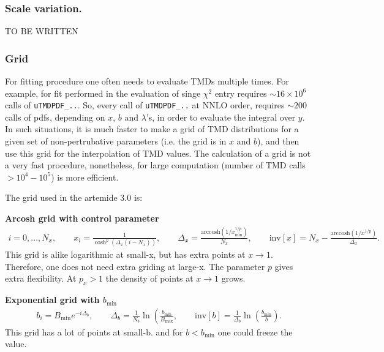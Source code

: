 \documentclass[prd,nofootinbib,eqsecnum,final]{revtex4}
\renewcommand{\(}{\left(}
\renewcommand{\)}{\right)}
\renewcommand{\[}{\left[}
\renewcommand{\]}{\right]}
\begin{document}
\subsubsection{Scale variation.} 

TO BE WRITTEN

\subsubsection{Grid}
\label{sec:OPE:grid1}

For fitting procedure one often needs to evaluate TMDs multiple times. For example, for fit performed in \cite{Scimemi:2017etj} the evaluation of singe $\chi^2$ entry requires $\sim 16\times 10^6$ calls of \texttt{uTMDPDF{\_}..}. So, every call of \texttt{uTMDPDF{\_}..} at NNLO order, requires $\sim 200$ calls of pdfs, depending on $x$, $b$ and $\lambda$'s, in order to evaluate the integral over $y$. In such situations, it is much faster to make a grid of TMD distributions for a given set of non-pertrubative parameters (i.e. the grid is in $x$ and $b$), and then use this grid for the interpolation of TMD values. The calculation of a grid is not a very fast procedure, nonetheless, for large computation (number of TMD calls $>10^4-10^5$) is more efficient.

The grid used in the artemide 3.0 is:

\textbf{Arcosh grid with control parameter}
\begin{eqnarray}\label{OPE:x-grid}
i=0,...,N_x,\qquad 
x_i=\frac{1}{\cosh^p\(\Delta_x(i-N_x)\)},\qquad \Delta_x=\frac{\text{arccosh}(1/x^{1/p}_{\text{min}})}{N_x},\qquad \text{inv}[x]=
N_x-\frac{\text{arccosh}(1/x^{1/p})}{\Delta_x}.
\end{eqnarray}
This grid is alike logarithmic at small-x, but has extra points at $x\to 1$. Therefore, one does not need extra griding at large-x. The parameter $p$ gives extra flexibility. At $p_x>1$ the density of points at $x\to 1$ grows. 

\textbf{Exponential grid with $b_{\text{min}}$} 
\begin{eqnarray}\label{OPE:b-grid}
b_i=B_{\text{min}} e^{-i \Delta_b},\qquad \Delta_b=\frac{1}{N_b}\ln\(\frac{b_{\text{min}}}{B_{\text{max}}},\qquad \text{inv}[b]=\frac{1}{\Delta_b}\ln\(\frac{b_{\text{min}}}{b}\).
\end{eqnarray}
This grid has a lot of points at small-b. and for $b<b_\text{min}$ one could freeze the value.
\end{document}
